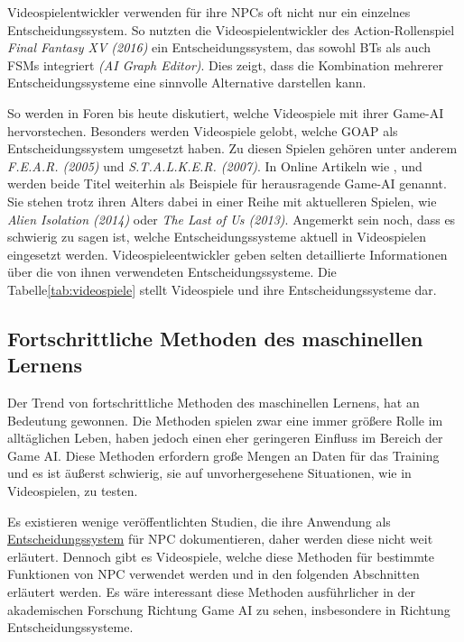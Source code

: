 Videospielentwickler verwenden f\"{u}r ihre NPCs oft nicht nur ein einzelnes Entscheidungssystem. So nutzten die Videospielentwickler des Action-Rollenspiel \textit{Final Fantasy XV (2016)} ein Entscheidungssystem, das sowohl BTs als auch FSMs integriert \textit{(AI Graph Editor)}. Dies zeigt, dass die Kombination mehrerer Entscheidungssysteme eine sinnvolle Alternative darstellen kann.

So werden in Foren bis heute diskutiert, welche Videospiele mit ihrer Game-AI hervorstechen. Besonders werden Videospiele gelobt, welche GOAP als Entscheidungssystem umgesetzt haben. Zu diesen Spielen geh\"{o}ren unter anderem \textit{F.E.A.R. (2005)} und \textit{S.T.A.L.K.E.R. (2007)}.
In Online Artikeln wie \autocite{vanceai}, \autocite{techopedia} und \autocite{gamerant} werden beide Titel weiterhin als Beispiele f\"{u}r herausragende Game-AI genannt. Sie stehen trotz ihren Alters dabei in einer Reihe mit aktuelleren Spielen, wie \textit{Alien Isolation (2014)} oder \textit{The Last of Us (2013)}.
Angemerkt sein noch, dass es schwierig zu sagen ist, welche Entscheidungssysteme aktuell in Videospielen eingesetzt werden. Videospieleentwickler geben selten detaillierte Informationen \"{u}ber die von ihnen verwendeten Entscheidungssysteme. Die Tabelle\ref{tab:videospiele} stellt Videospiele und ihre Entscheidungssysteme dar.


\subsection{Fortschrittliche Methoden des maschinellen Lernens}
\label{chap:sota ml}

Der Trend von fortschrittliche Methoden des maschinellen Lernens, hat an Bedeutung gewonnen. Die Methoden spielen zwar eine immer gr\"{o}\ss{}ere Rolle im allt\"{a}glichen Leben, haben jedoch einen eher geringeren Einfluss im Bereich der Game AI. Diese Methoden erfordern gro\ss{}e Mengen an Daten f\"{u}r das Training und es ist \"{a}u\ss{}erst schwierig, sie auf unvorhergesehene Situationen, wie in Videospielen, zu testen. \autocite{U2023}

Es existieren wenige ver\"{o}ffentlichten Studien, die ihre Anwendung als \hyperref[chap:entscheidungssysteme]{Entscheidungssystem} f\"{u}r NPC dokumentieren, \autocite{U2023} daher werden diese nicht weit erl\"{a}utert. Dennoch gibt es Videospiele, welche diese Methoden f\"{u}r bestimmte Funktionen von NPC verwendet werden und in den folgenden Abschnitten erl\"{a}utert werden. Es w\"{a}re interessant diese Methoden ausf\"{u}hrlicher in der akademischen Forschung Richtung Game AI zu sehen, insbesondere in Richtung Entscheidungssysteme.

